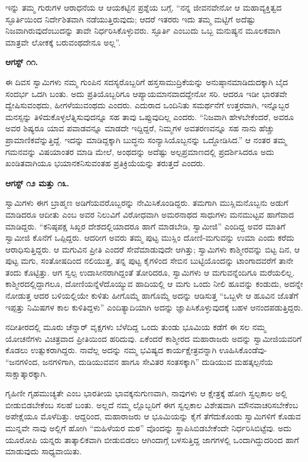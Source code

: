 ಇನ್ನು ತಮ್ಮ ಗುರುಗಳ ಆರಾಧನೆಯ ಆ ಆಯಕಟ್ಟಿನ ಪ್ರಶ್ನೆಯ ಬಗ್ಗೆ, “ನನ್ನ ಜೀವನವೇನೋ ಆ ಮಹಾವ್ಯಕ್ತಿತ್ವದ ಸ್ಫೂರ್ತಿಯಿಂದ ನಿರ್ದೇಶಿತವಾಗಿ ನಡೆಯುತ್ತಿರುವುದು; ಆದರೆ ಇತರರು ಇದು ತಮ್ಮ ಮಟ್ಟಿಗೆ ಅದೆಷ್ಟು ನಿಜವಾಗಿರುವುದೆಂಬುದನ್ನು ತಾವೇ ನಿರ್ಧರಿಸಿಕೊಳ್ಳುವರು. ಸ್ಫೂರ್ತಿ ಎಂಬುದು ಒಬ್ಬ ಮನುಷ್ಯನ ಮೂಲಕವಾಗಿ ಮಾತ್ರವೇ ಲೋಕಕ್ಕೆ ಬರುವಂಥದೇನೂ ಅಲ್ಲ”.

\textbf{ಆಗಸ್ಟ್ ೧೧.}

ಈ ದಿವಸ ಸ್ವಾಮಿಗಳು ನಮ್ಮ ಗುಂಪಿನ ಸದಸ್ಯರೊಬ್ಬರಿಗೆ ಹಸ್ತಸಾಮುದ್ರಿಕೆಯನ್ನು ಅನುಷ್ಠಾನಮಾಡಿದುದಕ್ಕಾಗಿ ಬೈದ ಸಂದರ್ಭ ಒದಗಿ ಬಂತು. ಅದು ಪ್ರತಿಯೊಬ್ಬರಿಗೂ ಆಪ್ಯಾಯಮಾನವಾದದ್ದೇನೋ ಸರಿ. ಆದರೂ ಇಡೀ ಭಾರತವೇ ದ್ವೇಷಿಸುವಂಥದು, ಹೀಗಳೆಯುವಂಥದು ಎಂದರು. ಎದುರಾದ ಒಂದಿನಿತು ಸಮರ್ಥನೆಗೆ ಉತ್ತರವಾಗಿ, ಇನ್ನೊಬ್ಬರ ಮನಸ್ಸನ್ನು ತಿಳಿದುಕೊಳ್ಳಲೆತ್ನಿಸುವುದನ್ನೂ ಸಹ ತಾವು ಒಪ್ಪುವುದಿಲ್ಲ ಎಂದರು. “ನಿಜವಾಗಿ ಹೇಳಬೇಕೆಂದರೆ, ಅವರೂ ಅವರ ಶಿಷ್ಯರೂ ಯಾವ ಪವಾಡವನ್ನೂ ಮಾಡದೇ ಇದ್ದಿದ್ದರೆ, ನಿಮ್ಮಗಳ ಅವತರಣವನ್ನೂ ಸಹ ನಾನು ಹೆಚ್ಚು ಪ್ರಾಮಾಣಿಕವೆನ್ನುತ್ತಿದ್ದೆ. ಇದನ್ನು ಮಾಡಿದ್ದಕ್ಕಾಗಿ ಬುದ್ಧನು ಸಂನ್ಯಾಸಿಯೊಬ್ಬನನ್ನು ಒದ್ದೋಡಿಸಿದ.” ಆ ನಂತರ ತಮ್ಮ ಗಮನವನ್ನು ವಿಷಯಾಂತರ ಮಾಡಿ ಮೇಲೆ, ಅಂಥದನ್ನು ಅದೆಷ್ಟು ಅಲ್ಪಪ್ರಮಾಣದಲ್ಲಿ ಪ್ರದರ್ಶಿಸಿದರೂ ಅದು ಖಂಡಿತವಾಗಿಯೂ ಭಯಾನಕನಿಸುವಂತಹ ಪ್ರತಿಕ್ರಿಯೆಯನ್ನು ತರುತ್ತದೆ ಎಂದರು.

\textbf{ಆಗಸ್ಟ್ ೧೨ ಮತ್ತು ೧೩.
 }

ಸ್ವಾಮಿಗಳು ಈಗ ಬ್ರಾಹ್ಮಣ ಅಡಿಗೆಯವರೊಬ್ಬರನ್ನು ನೇಮಿಸಿಕೊಂಡಿದ್ದರು. ತಮಗಾಗಿ ಮುಸ್ಲಿಮನೊಬ್ಬನು ಅಡುಗೆ ಮಾಡಿದರೂ ಆದೀತು ಎಂಬ ಅವರ ನಿಲುವಿಗೆ ವಿರೋಧವಾಗಿ ಅಮರನಾಥದ ಸಾಧುಗಳು ಮನಮುಟ್ಟವ ಹಾಗೆವಾದ ಮಾಡಿದ್ದರು. “ಕನಿಷ್ಠಪಕ್ಷ ಸಿಖ್ಖರ ದೇಶದಲ್ಲಿಯಾದರೂ ಹಾಗೆ ಮಾಡಬೇಡಿ, ಸ್ವಾಮೀಜಿ” ಎಂದಿದ್ದ ಅವರ ಮಾತಿಗೆ ಸ್ವಾಮೀಜಿ ಕೊನೆಗೆ ಒಪ್ಪಿದ್ದರು. ಆದರೀಗ ಅವರು ತಮ್ಮ ಪುಟ್ಟ ಮುಸ್ಲಿಂ ದೋಣಿ-ಮಗುವನ್ನು ಉಮಾ ಎಂದು ಕರೆದು ಆರಾಧಿಸುತ್ತಿದ್ದರು. ಆ ಮಗುವಿನ ಪ್ರೀತಿ ಎಂದರೆ ಸೇವೆಮಾಡುವುದೇ ಆಗಿತ್ತು; ಸ್ವಾಮಿಗಳು ಕಾಶ್ಮೀರವನ್ನು ಬಿಟ್ಟ ದಿನ, ಆ ಪುಟ್ಟ ಮಗು, ಸಂತೋಷದಿಂದ ನಲಿಯುತ್ತ, ತನ್ನ ಪುಟ್ಟ ಕೈಗಳಿಂದ ಸೇಬಿನ ಬುಟ್ಟಿಯೊಂದನ್ನು ಟಾಂಗಾದವರೆಗೆ ತಾನೇ ತಂದು ಕೊಟ್ಟಿತ್ತು. ಆಗ ಸ್ವಲ್ಪ ಉದಾಸೀನರಾಗಿದ್ದಂತೆ ತೋರಿದರೂ, ಸ್ವಾಮಿಗಳು ಆ ಮಗುವನ್ನೆಂದಿಗೂ ಮರೆಯಲಿಲ್ಲ. ಕಾಶ್ಮೀರದಲ್ಲಿದ್ದಾಗಲೂ, ದೋಣಿಯನ್ನೆಳೆದೊಯ್ಯುವ ಹಾದಿಯಲ್ಲಿ ಆ ಮಗು ಒಂದು ನೀಲಿ ಹೂವನ್ನು ಕಂಡುದು, ಅದನ್ನೇ ನೋಡುತ್ತ ಆದರ ಬಳಿಯಲ್ಲಿಯೇ ಕುಳಿತು ಹೀಗೊಮ್ಮೆ ಹಾಗೊಮ್ಮೆ ಅದನ್ನು ಆಡಿಸುತ್ತ “ಒಬ್ಬಳೇ ಆ ಹೂವಿನ ಜೊತೆಗೆ ಇಪ್ಪತ್ತು ನಿಮಿಷಗಳ ಕಾಲ ಕುಳಿತಿದ್ದಳು” ಎಂದಿತ್ಯಾದಿಯಾಗಿ ಅದನ್ನು ಜ್ಞಾಪಿಸಿಕೊಳ್ಳುವುದಕ್ಕೆ ಬಹಳ ಆನಂದಪಡುತ್ತಿದ್ದರು.

ನದೀತೀರದಲ್ಲಿ ಮೂರು ಚೆನ್ನಾರ್ ವೃಕ್ಷಗಳು ಬೆಳೆದಿದ್ದ ಒಂದು ತುಂಡು ಭೂಮಿಯ ಕಡೆಗೆ ಈ ಸಲ ನಮ್ಮ ಯೋಚನೆಗಳು ವಿಚಿತ್ರವಾದ ಪ್ರೀತಿಯಿಂದ ಹರಿದುವು. ಏಕೆಂದರೆ ಕಾಶ್ಮೀರದ ಮಹಾರಾಜರು ಅದನ್ನು ಸ್ವಾಮೀಜಿಯವರಿಗೆ ಕೊಡಲು ಉತ್ಸುಕರಾಗಿದ್ದರು. ನಾವೆಲ್ಲ ಅದನ್ನು ನಮ್ಮ ಭವಿಷ್ಯದ ಕಾರ್ಯಕ್ಷೇತ್ರವನ್ನಾಗಿ ಊಹಿಸಿಕೊಂಡೆವು- “ಜನಗಳಿಂದ, ಜನಗಳಿಗಾಗಿ, ದುಡಿಯುವವನ ಹಾಗೂ ಸೇವಿತರ ಸಂತಸಕ್ಕಾಗಿ” ದುಡಿಯುವ ಮಹತ್ಕಲ್ಪನೆಯ ಸಾಕ್ಷಾತ್ಕಾರಕ್ಕಾಗಿ.

ಗೃಹಿಣೀ ಗೃಹಮುಚ್ಯತೇ ಎಂಬ ಭಾರತೀಯ ಭಾವಕ್ಕನುಗುಣವಾಗಿ, ನಾವುಗಳು ಆ ಕ್ಷೇತ್ರಕ್ಕೆ ಹೋಗಿ ಸ್ವಲ್ಪಕಾಲ ಅಲ್ಲಿ ಬೀಡುಬಿಡಬೇಕೆಂಬ ಸಲಹೆ ಬಂತು. ಅಲ್ಲದೆ ನಮ್ಮ ಲ್ಲೊಬ್ಬರಿಗೆ ಈಗ ಸ್ವಲ್ಪಕಾಲ ವಿಶೇಷವಾಗಿ ಮೌನವಾಚರಿಸಬೇಕೆಂಬ ಅಪೇಕ್ಷೆಯೂ ಮೊಳೆದಿತ್ತು. ಆದ್ದರಿಂದ, ಮಹಾರಾಜರು ಆ ಭೂಮಿಯನ್ನು ಕೈಗೆ ತೆಗೆದುಕೊಂಡು ಸ್ವಾಮಿಗಳಿಗೆ ಕೊಡುವ ಮುನ್ನವೇ ನಾವು ಅಲ್ಲಿಗೆ ಹೋಗಿ “ಮಹಿಳೆಯರ ಮಠ” ವೊಂದನ್ನು ಸ್ಥಾಪಿಸಿಬಿಡಬೇಕೆಂದೇ ನಿರ್ಧರಿಸಿಬಿಟ್ಟೆವು. ಅದು ಯೂರೋಪಿ ಯನ್ನರು ತಾತ್ಕಾಲಿಕವಾಗಿ ಬೀಡುಬಿಡಲು ಆಗಿಂದಾಗ್ಗೆ ಬಳಸುತ್ತಿದ್ದ ಜಾಗಗಳಲ್ಲಿ ಒಂದಾಗಿದ್ದುದರಿಂದ ಹಾಗೆ ಮಾಡುವುದು ಸಾಧ್ಯವಾಯಿತು.

